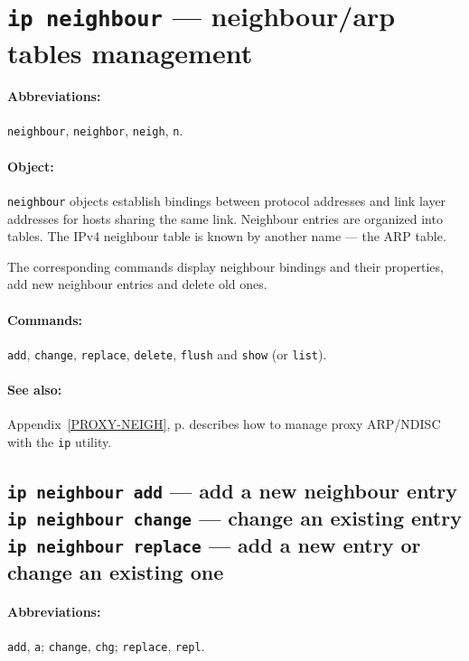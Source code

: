 \section{{\tt ip neighbour} --- neighbour/arp tables management}

\paragraph{Abbreviations:} \verb|neighbour|, \verb|neighbor|, \verb|neigh|,
\verb|n|.

\paragraph{Object:} \verb|neighbour| objects establish bindings between protocol
addresses and link layer addresses for hosts sharing the same link.
Neighbour entries are organized into tables. The IPv4 neighbour table
is known by another name --- the ARP table.

The corresponding commands display neighbour bindings
and their properties, add new neighbour entries and delete old ones.

\paragraph{Commands:} \verb|add|, \verb|change|, \verb|replace|,
\verb|delete|, \verb|flush| and \verb|show| (or \verb|list|).

\paragraph{See also:} Appendix~\ref{PROXY-NEIGH}, p.\pageref{PROXY-NEIGH}
describes how to manage proxy ARP/NDISC with the \verb|ip| utility.


\subsection{{\tt ip neighbour add} --- add a new neighbour entry\\
	{\tt ip neighbour change} --- change an existing entry\\
	{\tt ip neighbour replace} --- add a new entry or change an existing one}

\paragraph{Abbreviations:} \verb|add|, \verb|a|; \verb|change|, \verb|chg|;
\verb|replace|,	\verb|repl|.

